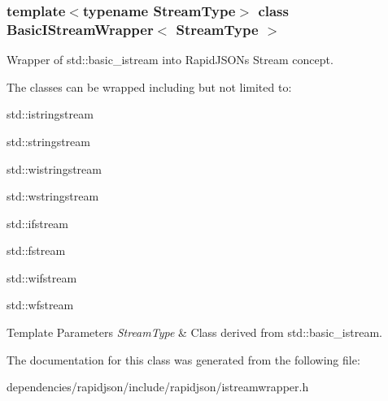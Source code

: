 \subsubsection*{template$<$typename Stream\+Type$>$\newline
class Basic\+I\+Stream\+Wrapper$<$ Stream\+Type $>$}

Wrapper of {\ttfamily std\+::basic\+\_\+istream} into Rapid\+J\+S\+ON\textquotesingle{}s Stream concept. 

The classes can be wrapped including but not limited to\+:


\begin{DoxyItemize}
\item {\ttfamily std\+::istringstream} 
\item {\ttfamily std\+::stringstream} 
\item {\ttfamily std\+::wistringstream} 
\item {\ttfamily std\+::wstringstream} 
\item {\ttfamily std\+::ifstream} 
\item {\ttfamily std\+::fstream} 
\item {\ttfamily std\+::wifstream} 
\item {\ttfamily std\+::wfstream} 
\end{DoxyItemize}


\begin{DoxyTemplParams}{Template Parameters}
{\em Stream\+Type} & Class derived from {\ttfamily std\+::basic\+\_\+istream}. \\
\hline
\end{DoxyTemplParams}


The documentation for this class was generated from the following file\+:\begin{DoxyCompactItemize}
\item 
dependencies/rapidjson/include/rapidjson/istreamwrapper.\+h\end{DoxyCompactItemize}
